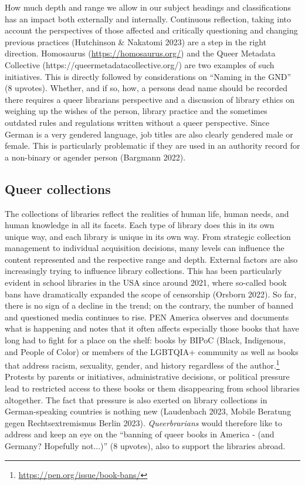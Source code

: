 \documentclass[a4paper,
fontsize=11pt,
oneside,
numbers=noperiodatend,
parskip=half-,
bibliography=totoc,
final
]{scrartcl}
\begin{document}
How much depth and range we allow in our subject headings and
classifications has an impact both externally and internally. Continuous
reflection, taking into account the perspectives of those affected and
critically questioning and changing previous practices (Hutchinson \&
Nakatomi 2023) are a step in the right direction. Homosaurus
(\url{https://homosaurus.org/}) and the Queer Metadata Collective
(https://queermetadatacollective.org/) are two examples of such
initiatives. This is directly followed by considerations on \enquote{Naming in
the GND} (8 upvotes). Whether, and if so, how, a
person\textquotesingle s dead name should be recorded there requires a
queer librarian\textquotesingle s perspective and a discussion of
library ethics on weighing up the wishes of the person, library practice
and the sometimes outdated rules and regulations written without a queer
perspective. Since German is a very gendered language, job titles are
also clearly gendered male or female. This is particularly problematic
if they are used in an authority record for a non-binary or agender
person (Bargmann 2022).

\hypertarget{queer-collections}{%
\subsection{Queer collections}\label{queer-collections}}

The collections of libraries reflect the realities of human life, human
needs, and human knowledge in all its facets. Each type of library does
this in its own unique way, and each library is unique in its own way.
From strategic collection management to individual acquisition
decisions, many levels can influence the content represented and the
respective range and depth. External factors are also increasingly
trying to influence library collections. This has been particularly
evident in school libraries in the USA since around 2021, where
so-called book bans have dramatically expanded the scope of censorship
(Orsborn 2022). So far, there is no sign of a decline in the trend; on
the contrary, the number of banned and questioned media continues to
rise. PEN America observes and documents what is happening and notes
that it often affects especially those books that have long had to fight
for a place on the shelf: books by BIPoC (Black, Indigenous, and People
of Color) or members of the LGBTQIA+ community as well as books that
address racism, sexuality, gender, and history regardless of the
author.\footnote{\url{https://pen.org/issue/book-bans/}} Protests by
parents or initiatives, administrative decisions, or political pressure
lead to restricted access to these books or them disappearing from
school libraries altogether. The fact that pressure is also exerted on
library collections in German-speaking countries is nothing new
(Laudenbach 2023, Mobile Beratung gegen Rechtsextremismus Berlin 2023).
\emph{Queerbrarians} would therefore like to address and keep an eye on
the \enquote{banning of queer books in America - (and Germany? Hopefully
not...)} (8 upvotes), also to support the libraries abroad.
\end{document}
